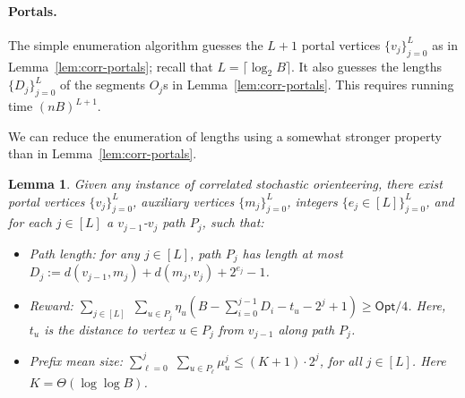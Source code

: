 \documentclass[11pt,letterpaper]{article}
\newtheorem{lemma}[theorem]{Lemma}
\numberwithin{algorithm}{section}
\newcommand{\Opt}{\ensuremath{\mathsf{Opt}}\xspace}
\begin{document}
\paragraph{Portals.}
The simple enumeration algorithm guesses the $L+1$ portal vertices $\{v_j\}_{j=0}^L$ as in Lemma~\ref{lem:corr-portals}; recall that $L=\lceil \log_2B\rceil$. It also guesses the lengths $\{D_j\}_{j=0}^L$ of the segments $O_j$s in Lemma~\ref{lem:corr-portals}. This requires running time $(nB)^{L+1}$.

We can reduce the enumeration of lengths using a somewhat stronger property than in Lemma~\ref{lem:corr-portals}.

\begin{lemma}\label{lem:corr-enum}
Given any instance of correlated stochastic orienteering, there exist portal vertices $\{v_j\}_{j=0}^L$, auxiliary vertices $\{m_j\}_{j=0}^L$, integers $\{e_j \in [L]\}_{j=0}^L$, and for each $j\in [L]$ a $v_{j-1}$-$v_j$ path $P_j$, such that:
\begin{itemize}
\item Path length: for any $j\in[L]$, path $P_j$ has  length at most $D_j := d(v_{j-1},m_j)+d(m_j,v_j)+2^{e_j}-1$.
\item Reward: $\sum_{j\in[L]} \,\, \sum_{u\in P_j} \eta_u(B-\sum_{i=0}^{j-1} D_i - t_u - 2^j+1) \ge \Opt/4$. Here, $t_u$ is the distance to vertex $u\in P_j$ from $v_{j-1}$ along path $P_j$.
\item Prefix mean size: $\sum_{\ell=0}^j \,\,\sum_{u\in P_\ell} \mu^j_u \le (K+1)\cdot 2^j$, for all $j\in[L]$. Here $K=\Theta(\log\log B)$.
\end{itemize}
\end{lemma}
\end{document}
